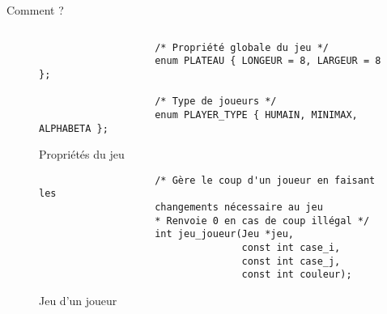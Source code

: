 \documentclass{beamer}
\begin{document}
\begin{frame}[fragile]{Comment ?}
\begin{columns}[onlytextwidth]
\begin{overprint}
\begin{figure}
\begin{verbatim}
                    /* Propriété globale du jeu */
                    enum PLATEAU { LONGEUR = 8, LARGEUR = 8 };

                    /* Type de joueurs */
                    enum PLAYER_TYPE { HUMAIN, MINIMAX, ALPHABETA };
                \end{verbatim}
                \caption*{Propriétés du jeu}
            \end{figure}
            \begin{figure}
                \vspace{25mm}
                \begin{verbatim}
                    /* Gère le coup d'un joueur en faisant les
                    changements nécessaire au jeu
                    * Renvoie 0 en cas de coup illégal */
                    int jeu_joueur(Jeu *jeu,
                                   const int case_i,
                                   const int case_j,
                                   const int couleur);
                \end{verbatim}
                \caption*{Jeu d'un joueur}
            \end{figure}
        \end{overprint}
    \end{columns}
    \vspace{-1cm}
\end{frame}
\end{document}
